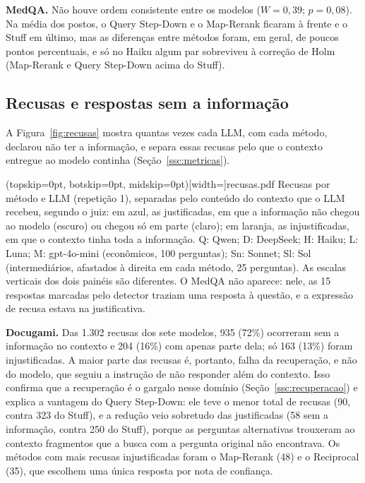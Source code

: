 \textbf{MedQA.} Não houve ordem consistente entre os modelos ($W = 0{,}39$; $p = 0{,}08$). Na média dos postos, o Query Step-Down e o Map-Rerank ficaram à frente e o Stuff em último, mas as diferenças entre métodos foram, em geral, de poucos pontos percentuais, e só no Haiku algum par sobreviveu à correção de Holm (Map-Rerank e Query Step-Down acima do Stuff).

\subsection{Recusas e respostas sem a informação}
\label{ssc:recusas}

A Figura~\ref{fig:recusas} mostra quantas vezes cada LLM, com cada método, declarou não ter a informação, e separa essas recusas pelo que o contexto entregue ao modelo continha (Seção~\ref{ssc:metricas}).

\Figure[!t](topskip=0pt, botskip=0pt, midskip=0pt)[width=\textwidth]{recusas.pdf}
{Recusas por método e LLM (repetição 1), separadas pelo conteúdo do contexto que o LLM recebeu, segundo o juiz: em azul, as justificadas, em que a informação não chegou ao modelo (escuro) ou chegou só em parte (claro); em laranja, as injustificadas, em que o contexto tinha toda a informação. Q: Qwen; D: DeepSeek; H: Haiku; L: Luna; M: gpt-4o-mini (econômicos, 100 perguntas); Sn: Sonnet; Sl: Sol (intermediários, afastados à direita em cada método, 25 perguntas). As escalas verticais dos dois painéis são diferentes. O MedQA não aparece: nele, as 15 respostas marcadas pelo detector traziam uma resposta à questão, e a expressão de recusa estava na justificativa.\label{fig:recusas}}

\textbf{Docugami.} Das 1.302 recusas dos sete modelos, 935 (72\%) ocorreram sem a informação no contexto e 204 (16\%) com apenas parte dela; só 163 (13\%) foram injustificadas. A maior parte das recusas é, portanto, falha da recuperação, e não do modelo, que seguiu a instrução de não responder além do contexto. Isso confirma que a recuperação é o gargalo nesse domínio (Seção~\ref{ssc:recuperacao}) e explica a vantagem do Query Step-Down: ele teve o menor total de recusas (90, contra 323 do Stuff), e a redução veio sobretudo das justificadas (58 sem a informação, contra 250 do Stuff), porque as perguntas alternativas trouxeram ao contexto fragmentos que a busca com a pergunta original não encontrava. Os métodos com mais recusas injustificadas foram o Map-Rerank (48) e o Reciprocal (35), que escolhem uma única resposta por nota de confiança.

